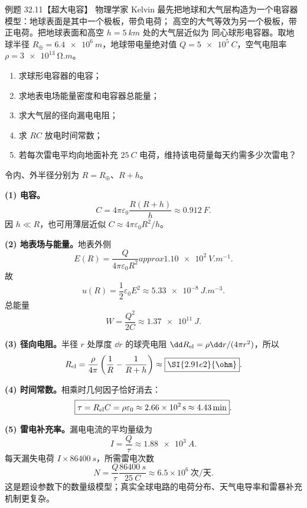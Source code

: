 \Needspace{0.44\textheight}
\begin{origexamplebox}{例题 32.11【超大电容】}
物理学家 Kelvin 最先把地球和大气层构造为一个电容器模型：地球表面是其中一个极板，带负电荷；
高空的大气等效为另一个极板，带正电荷。把地球表面和高空 $h=\SI{5}{km}$ 处的大气层近似为
同心球形电容器。取地球半径
$R_\oplus=\SI{6.4e6}{m}$，地球带电量绝对值 $Q=\SI{5e5}{C}$，空气电阻率
$\rho=\SI{3e13}{\ohm.m}$。
\begin{enumerate}[label=(\arabic*),leftmargin=2.2em]
  \item 求球形电容器的电容；
  \item 求地表电场能量密度和电容器总能量；
  \item 求大气层的径向漏电电阻；
  \item 求 $RC$ 放电时间常数；
  \item 若每次雷电平均向地面补充 $\SI{25}{C}$ 电荷，维持该电荷量每天约需多少次雷电？
\end{enumerate}
\end{origexamplebox}

\begin{xesolution}
令内、外半径分别为 $R=R_\oplus$、$R+h$。

\textbf{(1) 电容。}
\begin{equation}
  C=4\pi\varepsilon_0\frac{R(R+h)}h
  \approx\boxed{\SI{0.912}{F}}.
\end{equation}
因 $h\ll R$，也可用薄层近似 $C\approx4\pi\varepsilon_0R^2/h$。

\textbf{(2) 地表场与能量。}地表外侧
\[
  E(R)=\frac{Q}{4\pi\varepsilon_0R^2}approx\SI{1.10e2}{V.m^{-1}}.
\]
故
\begin{equation}
  \boxed{u(R)=\frac12\varepsilon_0E^2\approx\SI{5.33e-8}{J.m^{-3}}}.
\end{equation}
总能量
\begin{equation}
  \boxed{W=\frac{Q^2}{2C}\approx\SI{1.37e11}{J}}.
\end{equation}

\textbf{(3) 径向电阻。}半径 $r$ 处厚度 $\dd r$ 的球壳电阻
$\dd R_{\rm el}=\rho\dd r/(4\pi r^2)$，所以
\begin{equation}
  R_{\rm el}=\frac\rho{4\pi}\left(\frac1R-\frac1{R+h}\right)
  \approx\boxed{\SI{2.91e2}{\ohm}}.
\end{equation}

\textbf{(4) 时间常数。}相乘时几何因子恰好消去：
\begin{equation}
  \boxed{\tau=R_{\rm el}C=\rho\varepsilon_0
  \approx\SI{2.66e2}{s}\approx\SI{4.43}{min}}.
\end{equation}

\textbf{(5) 雷电补充率。}漏电电流的平均量级为
\[
  I=\frac Q\tau\approx\SI{1.88e3}{A}.
\]
每天漏失电荷 $I\times\SI{86400}{s}$，所需雷电次数
\begin{equation}
  \boxed{N=\frac{Q}{\tau}\frac{\SI{86400}{s}}{\SI{25}{C}}
  \approx6.5\times10^6\ \text{次/天}}.
\end{equation}
这是题设参数下的数量级模型；真实全球电路的电荷分布、天气电导率和雷暴补充机制更复杂。

\atmosphereCapacitorDiagram
\end{xesolution}

